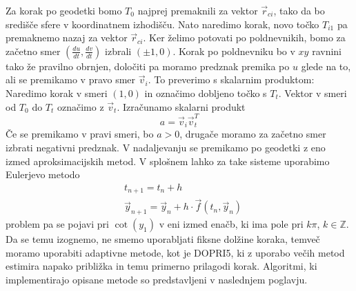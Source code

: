 \documentclass[titlepage]{article}
\begin{document}
Za korak po geodetki bomo \( T_{0} \) najprej premaknili za vektor \( \vec{r}_{ci} \), tako da bo središče sfere v koordinatnem izhodišču. Nato naredimo
korak, novo točko \( T_{i1} \) pa premaknemo nazaj za vektor \( \vec{r}_{ci} \).
Ker želimo potovati po poldnevnikih, bomo za začetno smer \(\left( \frac{du}{dt}, \frac{dv}{dt} \right) \) izbrali \(\left( \pm1, 0 \right) \). Korak po poldnevniku bo v \( xy \) ravnini tako že pravilno obrnjen, določiti pa moramo predznak premika po \( u \) glede na to, ali se premikamo v pravo smer \( \vec{v}_{i} \). To preverimo s skalarnim produktom:
\bigskip
\newline
Naredimo korak v smeri \(\left( 1, 0 \right) \) in označimo dobljeno točko s \( T_{t} \). Vektor v smeri od \( T_{0} \) do \( T_{t} \) označimo z \( \vec{v}_{t} \).
Izračunamo skalarni produkt
\begin{equation} \label{e:dirCorr}
    a= \vec{v}_{i} \vec{v}_{t}^T
\end{equation}
Če se premikamo v pravi smeri, bo \( a > 0 \), drugače moramo za začetno smer izbrati negativni predznak.
\bigskip
\newline
V nadaljevanju se premikamo po geodetki z eno izmed aproksimacijskih metod. V splošnem lahko za take sisteme uporabimo Eulerjevo metodo
\begin{equation} \label{e:euler}
    \begin{split}
        &t_{n+1}=t_{n}+h \\
        &\vec{y}_{n+1}=\vec{y}_{n}+h \cdot \vec{f}(t_{n}, \vec{y}_{n})
    \end{split}
\end{equation}
problem pa se pojavi pri \( \cot(y_{1}) \) v eni izmed enačb, ki ima pole pri
\( k\pi \), \( k \in \mathbb{Z} \). Da se temu izognemo, ne smemo uporabljati fiksne dolžine koraka, temveč moramo uporabiti adaptivne metode, kot je DOPRI5,
ki z uporabo večih metod estimira napako približka in temu primerno prilagodi korak.
\bigskip
\newline
Algoritmi, ki implementirajo opisane metode so predstavljeni v naslednjem poglavju.
\newpage
\end{document}
